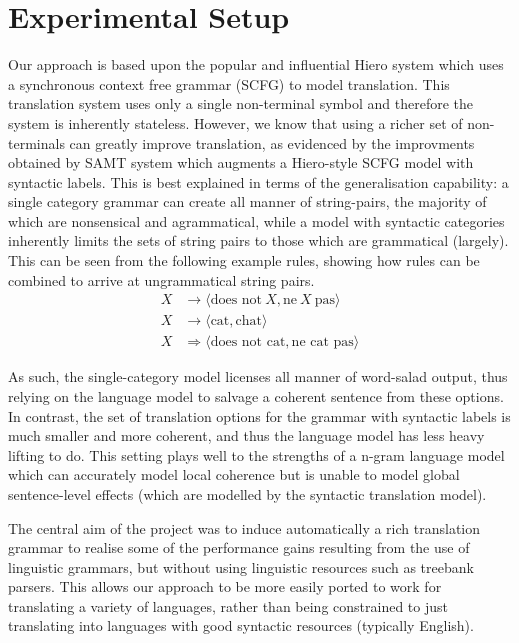 \chapter{Experimental Setup}

Our approach is based upon the popular and influential Hiero system \cite{chiang07} which uses a synchronous context free grammar (SCFG) to model translation. 
This translation system uses only a single non-terminal symbol and therefore the system is inherently stateless. 
However, we know that using a richer set of non-terminals can greatly improve translation, as evidenced by the improvments obtained by SAMT system \cite{samt} which augments a Hiero-style SCFG model with syntactic labels.
This is best explained in terms of the generalisation capability: a single category grammar can create all manner of string-pairs, the majority of which are nonsensical and agrammatical, while a model with syntactic categories inherently limits the sets of string pairs to those which are grammatical (largely).
This can be seen from the following example rules, showing how rules can be combined to arrive at ungrammatical string pairs.
\begin{align*}
X &\rightarrow \langle \mbox{does not}~X, \mbox{ne}~X~\mbox{pas} \rangle \\
X &\rightarrow \langle \mbox{cat}, \mbox{chat} \rangle \\
X &\Rightarrow \langle \mbox{does not cat}, \mbox{ne cat pas} \rangle
\end{align*}

As such, the single-category model licenses all manner of word-salad output, thus relying on the language model to salvage a coherent sentence from these options.
In contrast, the set of translation options for the grammar with syntactic labels is much smaller and more coherent, and thus the language model has less heavy lifting to do.
This setting plays well to the strengths of a n-gram language model which can accurately model local coherence but is unable to model global sentence-level effects (which are modelled by the syntactic translation model). 

The central aim of the project was to induce automatically a rich translation grammar to realise some of the performance gains resulting from the use of linguistic grammars, but without using linguistic resources such as treebank parsers.
This allows our approach to be more easily ported to work for translating a variety of languages, rather than being constrained to just translating into languages with good syntactic resources (typically English).

